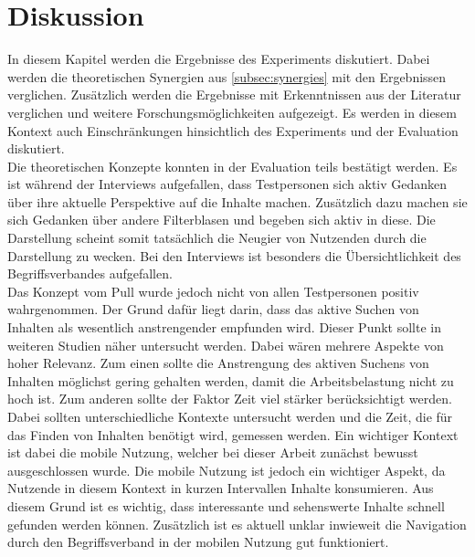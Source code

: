 \section{Diskussion}
In diesem Kapitel werden die Ergebnisse des Experiments diskutiert.
Dabei werden die theoretischen Synergien aus \autoref{subsec:synergies} mit den Ergebnissen verglichen.
Zusätzlich werden die Ergebnisse mit Erkenntnissen aus der Literatur verglichen und weitere Forschungsmöglichkeiten aufgezeigt.
Es werden in diesem Kontext auch Einschränkungen hinsichtlich des Experiments und der Evaluation diskutiert.\\

Die theoretischen Konzepte konnten in der Evaluation teils bestätigt werden.
Es ist während der Interviews aufgefallen, dass Testpersonen sich aktiv Gedanken über ihre aktuelle Perspektive auf die Inhalte machen.
Zusätzlich dazu machen sie sich Gedanken über andere Filterblasen und begeben sich aktiv in diese.
Die Darstellung scheint somit tatsächlich die Neugier von Nutzenden durch die Darstellung zu wecken.
Bei den Interviews ist besonders die Übersichtlichkeit des Begriffsverbandes aufgefallen. \\

Das Konzept vom Pull wurde jedoch nicht von allen Testpersonen positiv wahrgenommen.
Der Grund dafür liegt darin, dass das aktive Suchen von Inhalten als wesentlich anstrengender empfunden wird.
Dieser Punkt sollte in weiteren Studien näher untersucht werden.
Dabei wären mehrere Aspekte von hoher Relevanz.
Zum einen sollte die Anstrengung des aktiven Suchens von Inhalten möglichst gering gehalten werden, damit die Arbeitsbelastung nicht zu hoch ist.
Zum anderen sollte der Faktor Zeit viel stärker berücksichtigt werden.
Dabei sollten unterschiedliche Kontexte untersucht werden und die Zeit, die für das Finden von Inhalten benötigt wird, gemessen werden.
Ein wichtiger Kontext ist dabei die mobile Nutzung, welcher bei dieser Arbeit zunächst bewusst ausgeschlossen wurde.
Die mobile Nutzung ist jedoch ein wichtiger Aspekt, da Nutzende in diesem Kontext in kurzen Intervallen Inhalte konsumieren.
Aus diesem Grund ist es wichtig, dass interessante und sehenswerte Inhalte schnell gefunden werden können.
Zusätzlich ist es aktuell unklar inwieweit die Navigation durch den Begriffsverband in der mobilen Nutzung gut funktioniert.\\

